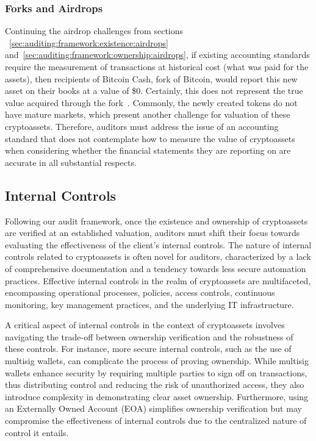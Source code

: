 \subsubsection{Forks and Airdrops}
Continuing the airdrop challenges from sections ~\ref{sec:auditing:framework:existence:airdrops} and~\ref{sec:auditing:framework:ownership:airdrops}, if existing accounting standards require the measurement of transactions at historical cost (what was paid for the assets), then recipients of Bitcoin Cash, fork of Bitcoin, would report this new asset on their books at a value of \$0. Certainly, this does not represent the true value acquired through the fork~\cite{webb2018fork}. Commonly, the newly created tokens do not have mature markets, which present another challenge for valuation of these cryptoassets. Therefore, auditors must address the issue of an accounting standard that does not contemplate how to measure the value of cryptoassets when considering whether the financial statements they are reporting on are accurate in all substantial respects.


\subsection{Internal Controls} \label{sec:auditing:framework:internalcontrol}

Following our audit framework, once the existence and ownership of cryptoassets are verified at an established valuation, auditors must shift their focus towards evaluating the effectiveness of the client's internal controls. The nature of internal controls related to cryptoassets is often novel for auditors, characterized by a lack of comprehensive documentation and a tendency towards less secure automation practices. Effective internal controls in the realm of cryptoassets are multifaceted, encompassing operational processes, policies, access controls, continuous monitoring, key management practices, and the underlying IT infrastructure.

A critical aspect of internal controls in the context of cryptoassets involves navigating the trade-off between ownership verification and the robustness of these controls. For instance, more secure internal controls, such as the use of multisig wallets, can complicate the process of proving ownership. While multisig wallets enhance security by requiring multiple parties to sign off on transactions, thus distributing control and reducing the risk of unauthorized access, they also introduce complexity in demonstrating clear asset ownership. Furthermore, using an Externally Owned Account (EOA) simplifies ownership verification but may compromise the effectiveness of internal controls due to the centralized nature of control it entails.

